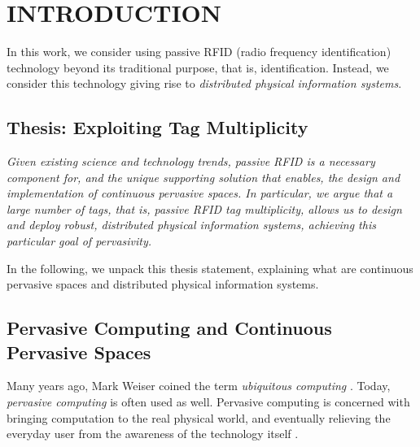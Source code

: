 \chapter{INTRODUCTION}
\label{Section: Introduction}

In this work, we consider using passive RFID (radio frequency identification) technology beyond its traditional purpose, that is, identification. Instead, we consider this technology giving rise to \emph{distributed physical information systems}.

\section{Thesis: Exploiting Tag Multiplicity}
\emph{Given existing science and technology trends, passive RFID is a necessary component for, and the unique supporting solution that enables, the design and implementation of continuous pervasive spaces. In particular, we argue that a large number of tags, that is, passive RFID tag multiplicity, allows us to design and deploy robust, distributed physical information systems, achieving this particular goal of pervasivity.} 

In the following, we unpack this thesis statement, explaining what are continuous pervasive spaces and distributed physical information systems. 

\section{Pervasive Computing and Continuous Pervasive Spaces}
Many years ago, Mark Weiser coined the term \emph{ubiquitous computing} \cite{1991 Weiser}. Today, \emph{pervasive computing} is often used as well. Pervasive computing is concerned with bringing computation to the real physical world, and eventually relieving the everyday user from the awareness of the technology itself \cite{1991 Weiser}.

